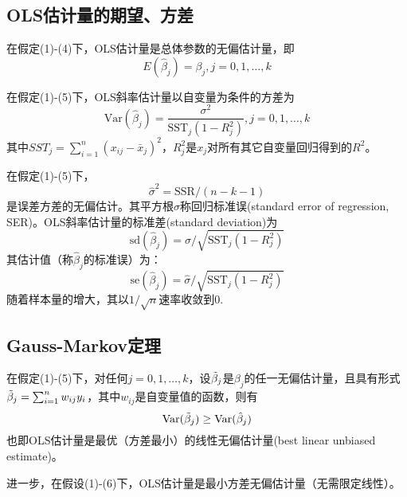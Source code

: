 \subsection{OLS估计量的期望、方差}

\par 在假定(1)-(4)下，OLS估计量是总体参数的无偏估计量，即
\begin{equation}
    E(\hat{\beta}_j)=\beta_j, j=0,1,\dots,k
\end{equation}
\par 在假定(1)-(5)下，OLS斜率估计量以自变量为条件的方差为
\begin{equation}
    \text{Var}(\hat{\beta}_j)=\frac{\sigma^2}{\text{SST}_j (1-R_j^2)}, j=0,1,\dots,k \label{eq:Variance}
\end{equation}
其中$SST_j=\sum_{i=1}^n (x_{ij}-\bar{x}_j)^2$，$R_j^2$是$x_j$对所有其它自变量回归得到的$R^2$。
\par 在假定(1)-(5)下，
\begin{equation}
    \hat{\sigma}^2=\text{SSR}/(n-k-1)
\end{equation}
是误差方差的无偏估计。其平方根$\hat{\sigma}$称回归标准误(standard error of regression, SER)。OLS斜率估计量的标准差(standard deviation)为
\begin{equation}
    \text{sd}(\hat{\beta}_j)=\sigma/\sqrt{\text{SST}_j(1-R_j^2)}
\end{equation}
其估计值（称$\hat{\beta}_j$的标准误）为：
\begin{equation}
    \text{se}(\hat{\beta}_j)=\hat{\sigma}/\sqrt{\text{SST}_j(1-R_j^2)}
\end{equation}
随着样本量的增大，其以$1/\sqrt{n}$速率收敛到0. 

\subsection{Gauss-Markov定理}

\par 在假定(1)-(5)下，对任何$j=0,1,\dots,k$，设$\Tilde{\beta}_j$是$\beta_j$的任一无偏估计量，且具有形式$\Tilde{\beta}_j=\sum_{i=1}^n w_{ij}y_i$，其中$w_{ij}$是自变量值的函数，则有
\begin{equation}
    \text{Var}(\Tilde{\beta}_j)\ge \text{Var}(\hat{\beta}_j)
\end{equation}
也即OLS估计量是最优（方差最小）的线性无偏估计量(best linear unbiased estimate)。
\par 进一步，在假设(1)-(6)下，OLS估计量是最小方差无偏估计量（无需限定线性）。

